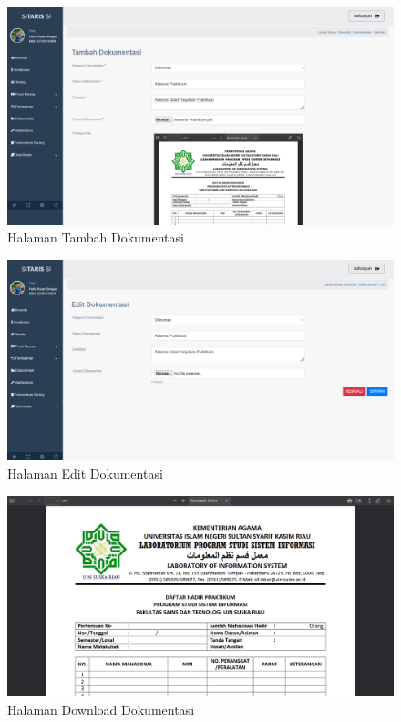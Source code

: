 \begin{enumerate}
        \begin{figure}
          \centering
          \includegraphics[width=0.82\linewidth]{konten//gambar/dokumentasi tambah.png}
          \caption{Halaman Tambah Dokumentasi}
          \label{fig:enter-label}
        \end{figure}

        \begin{figure}
          \centering
          \includegraphics[width=0.82\linewidth]{konten//gambar/dokumentasi edit.png}
          \caption{Halaman Edit Dokumentasi}
          \label{fig:enter-label}
        \end{figure}

        \begin{figure}
          \centering
          \includegraphics[width=0.82\linewidth]{konten//gambar/dokumentasi download.png}
          \caption{Halaman Download Dokumentasi}
          \label{fig:enter-label}
        \end{figure}


\end{enumerate}
